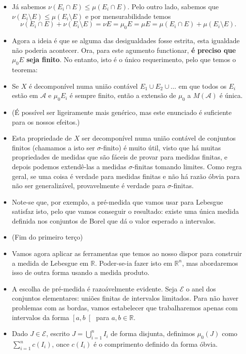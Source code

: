 \documentclass{article}
\newcommand{\R}{\mathbb{R}}
\begin{document}
\begin{itemize}
\item Já sabemos $\nu(E_i \cap E) \leq \mu(E_i \cap E)$. Pelo outro lado, sabemos que $\nu(E_i \setminus E) \leq \mu(E_i \setminus E)$ e por mensurabilidade temos
\[\nu(E_i \cap E) + \nu(E_i \setminus E) = \nu E = \mu_0 E = \mu E = \mu(E_i \cap E) + \mu(E_i \setminus E).\]
\item Agora a ideia é que se alguma das desigualdades fosse estrita, esta igualdade não poderia acontecer. Ora, para este agumento functionar, \textbf{é preciso que $\mu_0 E$ seja finito}. No entanto, isto é o único requerimento, pelo que temos o teorema:
\item Se $X$ é decomponível numa união contável $E_1 \cup E_2 \cup \dots$ em que todos os $E_i$ estão em $\mathcal A$ e $\mu_0 E_i$ é sempre finito, então a extensão de $\mu_0$ a $M(\mathcal A)$ é única.
\item (É possível ser ligeiramente mais genérico, mas este enunciado é suficiente para os nossos efeitos.)
\item Esta propriedade de $X$ ser decomponível numa união contável de conjuntos finitos (chamamos a isto ser $\sigma$-finito) é muito útil, visto que há muitas propriedades de medidas que são fáceis de provar para medidas finitas, e depois podemos extendê-las a medidas $\sigma$-finitas tomando limites. Como regra geral, se uma coisa é verdade para medidas finitas e não há razão óbvia para não ser generalizável, provavelmente é verdade para $\sigma$-finitas.
\item Note-se que, por exemplo, a pré-medida que vamos usar para Lebesgue satisfaz isto, pelo que vamos conseguir o resultado: existe uma única medida definida nos conjuntos de Borel que dá o valor esperado a intervalos.
\item (Fim do primeiro terço)
\item Vamos agora aplicar as ferramentas que temos ao nosso dispor para construir a medida de Lebesgue em $\R$. Poder-se-ia fazer isto em $\R^n$, mas abordaremos isso de outra forma usando a medida produto.
\item A escolha de pré-medida é razoávelmente evidente. Seja $\mathcal E$ o anel dos conjuntos elementares: uniões finitas de intervalos limitados. Para não haver problemas com as bordas, vamos estabelecer que trabalharemos apenas com intervalos da forma $\left[a,b\right[$ para $a,b \in \R$.
\item Dado $J \in \mathcal E$, escrito $J = \bigcup_{i=1}^n I_i$ de forma disjunta, definimos $\mu_0(J)$ como $\sum_{i=1}^n c(I_i)$, once $c(I_i)$ é o comprimento definido da forma óbvia.

\end{itemize}
\end{document}

